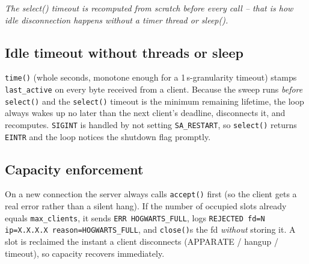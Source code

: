 \documentclass[11pt,a4paper]{article}
\newcommand{\handfont}{\itshape}
\newcommand{\handfont}{\CaveatFamily}
\newcommand{\annot}[1]{{\handfont\large\color{teal}#1}}
\begin{document}
\annot{The select() timeout is recomputed from scratch \emph{before every call}
-- that is how idle disconnection happens without a timer thread or sleep().}

\subsection{Idle timeout without threads or sleep}
\texttt{time()} (whole seconds, monotone enough for a 1\,s-granularity timeout)
stamps \texttt{last\_active} on every byte received from a client. Because the
sweep runs \emph{before} \texttt{select()} and the \texttt{select()} timeout is
the minimum remaining lifetime, the loop always wakes up no later than the next
client's deadline, disconnects it, and recomputes. \texttt{SIGINT} is handled by
not setting \texttt{SA\_RESTART}, so \texttt{select()} returns \texttt{EINTR} and
the loop notices the shutdown flag promptly.

\subsection{Capacity enforcement}\label{sec:capacity}
On a new connection the server always calls \texttt{accept()} first (so the
client gets a real error rather than a silent hang). If the number of occupied
slots already equals \texttt{max\_clients}, it sends \texttt{ERR HOGWARTS\_FULL},
logs \texttt{REJECTED fd=N ip=X.X.X.X reason=HOGWARTS\_FULL}, and
\texttt{close()}s the fd \emph{without} storing it. A slot is reclaimed the
instant a client disconnects (APPARATE / hangup / timeout), so capacity
recovers immediately.
\end{document}
